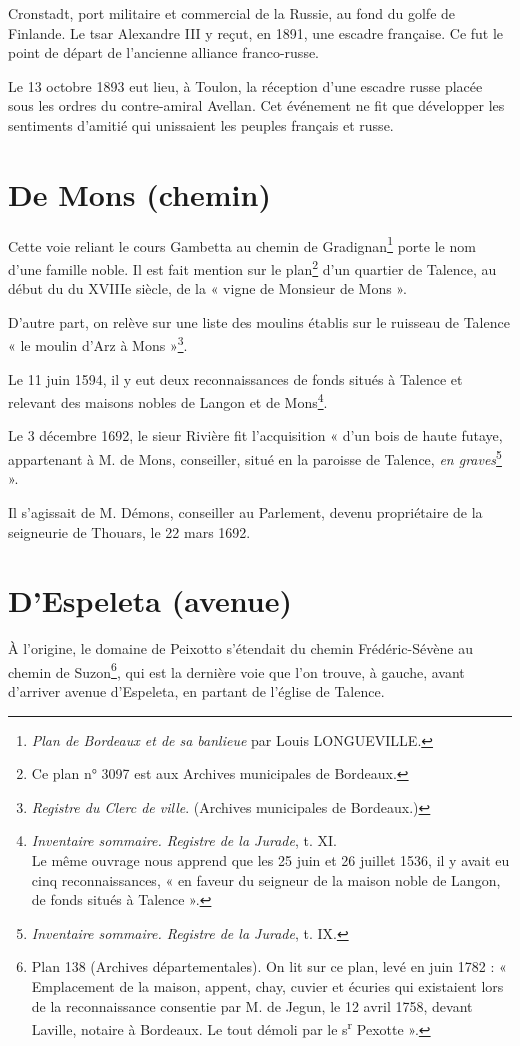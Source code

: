 \documentclass[a4paper,11pt]{book}
\begin{document}
Cronstadt, port militaire et commercial de la Russie, au fond du golfe de Finlande. Le tsar Alexandre III y reçut, en 1891, une escadre française. Ce fut le point de départ de l'ancienne alliance franco-russe.

Le 13 octobre 1893 eut lieu, à Toulon, la réception d'une escadre russe placée sous les ordres du contre-amiral Avellan. Cet événement ne fit que développer les sentiments d'amitié qui unissaient les peuples français et russe.

\section{De Mons (chemin)}

Cette voie reliant le cours Gambetta au chemin de Gradignan\footnote{\textit{Plan de Bordeaux et de sa banlieue} par Louis \textsc{LONGUEVILLE}.} porte le nom d'une famille noble. Il est fait mention sur le plan\footnote{Ce plan n° 3097 est aux Archives municipales de Bordeaux.} d'un quartier de Talence, au début du du XVIIIe siècle, de la « vigne de Monsieur de Mons ».

D'autre part, on relève sur une liste des moulins établis sur le ruisseau de Talence « le moulin d'Arz à Mons »\footnote{\textit{Registre du Clerc de ville}. (Archives municipales de Bordeaux.)}.

Le 11 juin 1594, il y eut deux reconnaissances de fonds situés à Talence et relevant des maisons nobles de Langon et de Mons\footnote{\textit{Inventaire sommaire. Registre de la Jurade}, t. XI.\\Le même ouvrage nous apprend que les 25 juin et 26 juillet 1536, il y avait eu cinq reconnaissances, « en faveur du seigneur de la maison noble de Langon, de fonds situés à Talence ».}.

Le 3 décembre 1692, le sieur Rivière fit l'acquisition « d'un bois de haute futaye, appartenant à M. de Mons, conseiller, situé en la paroisse de Talence, \textit{en graves}\footnote{\textit{Inventaire sommaire. Registre de la Jurade}, t. IX.} ».

Il s'agissait de M. Démons, conseiller au Parlement, devenu propriétaire de la seigneurie de Thouars, le 22 mars 1692.

\section{D'Espeleta (avenue)}

À l'origine, le domaine de Peixotto s'étendait du chemin Frédéric-Sévène au chemin de Suzon\footnote{Plan 138 (Archives départementales). On lit sur ce plan, levé en juin 1782 : « Emplacement de la maison, appent, chay, cuvier et écuries qui existaient lors de la reconnaissance consentie par M. de Jegun, le 12 avril 1758, devant Laville, notaire à Bordeaux. Le tout démoli par le s\textsuperscript{r} Pexotte ».}, qui est la dernière voie que l'on trouve, à gauche, avant d'arriver avenue d'Espeleta, en partant de l'église de Talence.
\end{document}
